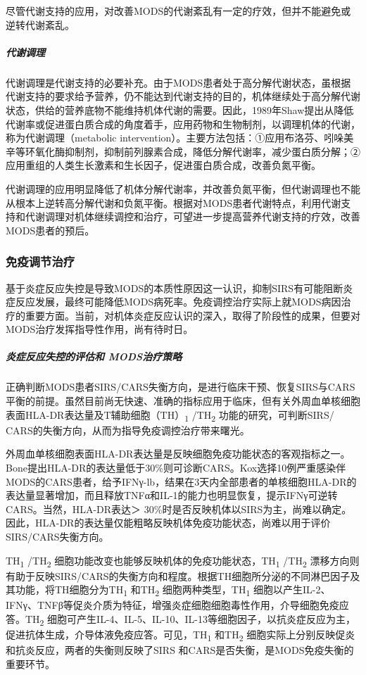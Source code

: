 尽管代谢支持的应用，对改善MODS的代谢紊乱有一定的疗效，但并不能避免或逆转代谢紊乱。

\subparagraph{代谢调理}

代谢调理是代谢支持的必要补充。由于MODS患者处于高分解代谢状态，虽根据代谢支持的要求给予营养，仍不能达到代谢支持的目的，机体继续处于高分解代谢状态，供给的营养底物不能维持机体代谢的需要。因此，1989年Shaw提出从降低代谢率或促进蛋白质合成的角度着手，应用药物和生物制剂，以调理机体的代谢，称为代谢调理（metabolic
intervention）。主要方法包括：①应用布洛芬、吲哚美辛等环氧化酶抑制剂，抑制前列腺素合成，降低分解代谢率，减少蛋白质分解；②应用重组的人类生长激素和生长因子，促进蛋白质合成，改善负氮平衡。

代谢调理的应用明显降低了机体分解代谢率，并改善负氮平衡，但代谢调理也不能从根本上逆转高分解代谢和负氮平衡。根据对MODS患者代谢特点，利用代谢支持和代谢调理对机体继续调控和治疗，可望进一步提高营养代谢支持的疗效，改善MODS患者的预后。

\subsubsection{免疫调节治疗}

基于炎症反应失控是导致MODS的本质性原因这一认识，抑制SIRS有可能阻断炎症反应发展，最终可能降低MODS病死率。免疫调控治疗实际上就MODS病因治疗的重要方面。当前，对机体炎症反应认识的深入，取得了阶段性的成果，但要对MODS治疗发挥指导性作用，尚有待时日。

\subparagraph{炎症反应失控的评估和 MODS治疗策略}

正确判断MODS患者SIRS/CARS失衡方向，是进行临床干预、恢复SIRS与CARS平衡的前提。虽然目前尚无快速、准确的指标应用于临床，但有关外周血单核细胞表面HLA-DR表达量及T辅助细胞（TH）\textsubscript{1}
/TH\textsubscript{2} 功能的研究，可判断SIRS/
CARS的失衡方向，从而为指导免疫调控治疗带来曙光。

外周血单核细胞表面HLA-DR表达量是反映细胞免疫功能状态的客观指标之一。Bone提出HLA-DR的表达量低于30\%则可诊断CARS。Kox选择10例严重感染伴MODS的CARS患者，给予IFNγ-lb，结果在3天内全部患者的单核细胞HLA-DR的表达量显著增加，而且释放TNFα和IL-1的能力也明显恢复，提示IFNγ可逆转CARS。当然，HLA-DR表达＞
30\%时是否反映机体以SIRS为主，尚难以确定。因此，HLA-DR的表达量仅能粗略反映机体免疫功能状态，尚难以用于评价SIRS/CARS失衡方向。

TH\textsubscript{1} /TH\textsubscript{2}
细胞功能改变也能够反映机体的免疫功能状态，TH\textsubscript{1}
/TH\textsubscript{2}
漂移方向则有助于反映SIRS/CARS的失衡方向和程度。根据TH细胞所分泌的不同淋巴因子及其功能，将TH细胞分为TH\textsubscript{1}
和TH\textsubscript{2} 细胞两种类型，TH\textsubscript{1}
细胞以产生IL-2、IFNγ、TNFβ等促炎介质为特征，增强炎症细胞细胞毒性作用，介导细胞免疫应答。TH\textsubscript{2}
细胞可产生IL-4、IL-5、IL-10、IL-13等细胞因子，以抗炎症反应为主，促进抗体生成，介导体液免疫应答。可见，TH\textsubscript{1}
和TH\textsubscript{2}
细胞实际上分别反映促炎和抗炎反应，两者的失衡则反映了SIRS
和CARS是否失衡，是MODS免疫失衡的重要环节。

